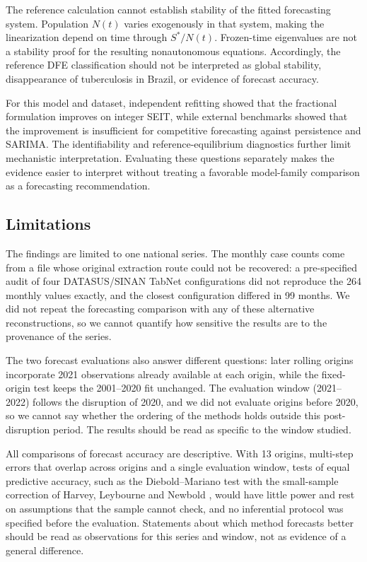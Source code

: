 \documentclass[pdflatex,sn-mathphys-ay]{sn-jnl}
\begin{document}
The reference calculation cannot establish stability of the fitted forecasting system. Population $N(t)$ varies exogenously in that system, making the linearization depend on time through $S^*/N(t)$. Frozen-time eigenvalues are not a stability proof for the resulting nonautonomous equations. Accordingly, the reference DFE classification should not be interpreted as global stability, disappearance of tuberculosis in Brazil, or evidence of forecast accuracy.

For this model and dataset, independent refitting showed that the fractional formulation improves on integer SEIT, while external benchmarks showed that the improvement is insufficient for competitive forecasting against persistence and SARIMA. The identifiability and reference-equilibrium diagnostics further limit mechanistic interpretation. Evaluating these questions separately makes the evidence easier to interpret without treating a favorable model-family comparison as a forecasting recommendation.

\subsection{Limitations}

The findings are limited to one national series. The monthly case counts come from a file whose original extraction route could not be recovered: a pre-specified audit of four DATASUS/SINAN TabNet configurations did not reproduce the 264 monthly values exactly, and the closest configuration differed in 99 months. We did not repeat the forecasting comparison with any of these alternative reconstructions, so we cannot quantify how sensitive the results are to the provenance of the series.

The two forecast evaluations also answer different questions: later rolling origins incorporate 2021 observations already available at each origin, while the fixed-origin test keeps the 2001--2020 fit unchanged. The evaluation window (2021--2022) follows the disruption of 2020, and we did not evaluate origins before 2020, so we cannot say whether the ordering of the methods holds outside this post-disruption period. The results should be read as specific to the window studied.

All comparisons of forecast accuracy are descriptive. With 13 origins, multi-step errors that overlap across origins and a single evaluation window, tests of equal predictive accuracy, such as the Diebold--Mariano test \citep{diebold1995} with the small-sample correction of Harvey, Leybourne and Newbold \citep{harvey1997}, would have little power and rest on assumptions that the sample cannot check, and no inferential protocol was specified before the evaluation. Statements about which method forecasts better should be read as observations for this series and window, not as evidence of a general difference.
\end{document}
